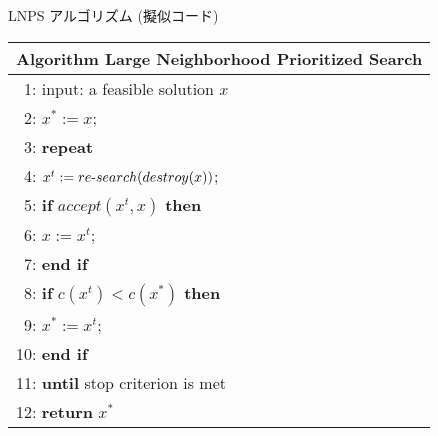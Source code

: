 \documentclass[11pt,dvipdfmx]{beamer}
\begin{document}
\begin{frame}{LNPS アルゴリズム (擬似コード)}
\centering
\begin{tabular}{l}\hline
\textbf{Algorithm} Large Neighborhood Prioritized Search\\\hline
 ~1: input: a feasible solution $x$ \\
 ~2: $x^{*} :=  x$; \\
 ~3: \bf{repeat} \\
 ~4: \quad \quad $x^{t} := re\mathchar`-search(destroy(x))$; \\
 ~5: \quad \quad \textbf{if} $accept(x^{t}, x)$ \textbf{then} \\
 ~6: \quad \quad \quad \quad $x := x^{t}$; \\
 ~7: \quad \quad \textbf{end if} \\
 ~8: \quad \quad \textbf{if} $c(x^{t}) < c(x^{*})$ \textbf{then} \\
 ~9: \quad \quad \quad \quad $x^{*} := x^{t}$; \\
10: \quad \quad \textbf{end if} \\
11: \textbf{until} stop criterion is met \\
12: \textbf{return} $x^{*}$ \\ \hline
\end{tabular}
\end{frame}
\end{document}
